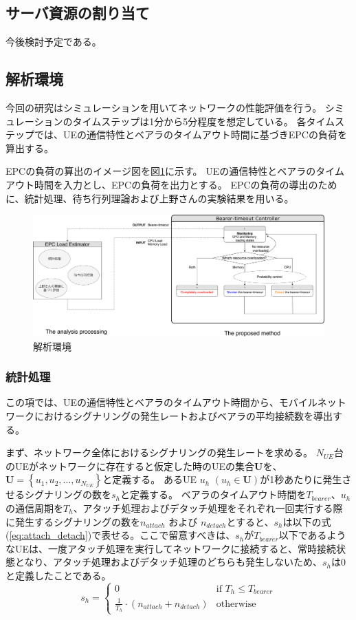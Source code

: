 \documentclass[a4j]{ujarticle}
\begin{document}
\subsection{サーバ資源の割り当て}
今後検討予定である。


\subsection{解析環境}
\label{sec:method}
今回の研究はシミュレーションを用いてネットワークの性能評価を行う。
シミュレーションのタイムステップは1分から5分程度を想定している。
各タイムステップでは、UEの通信特性とベアラのタイムアウト時間に基づきEPCの負荷を算出する。

EPCの負荷の算出のイメージ図を図\ref{analysis_environment}に示す。
UEの通信特性とベアラのタイムアウト時間を入力とし、EPCの負荷を出力とする。
EPCの負荷の導出のために、統計処理、待ち行列理論および上野さんの実験結果を用いる。
\begin{figure}[htbp]
	\centering
	\includegraphics[width=0.9\hsize]{analysis_environment.pdf}
  \caption{解析環境}
	\label{analysis_environment}
\end{figure}
\clearpage

\subsubsection{統計処理}
この項では、UEの通信特性とベアラのタイムアウト時間から、モバイルネットワークにおけるシグナリングの発生レートおよびベアラの平均接続数を導出する。


まず、ネットワーク全体におけるシグナリングの発生レートを求める。
$N_{UE}$台のUEがネットワークに存在すると仮定した時のUEの集合$\bm{U}$を、$\bm{U} = \left\{ u_1,u_2,\ldots,u_{N_{UE}} \right\}$と定義する。
あるUE $u_h$ $(u_h \in \bm{U})$が1秒あたりに発生させるシグナリングの数を$s_h$と定義する。
ベアラのタイムアウト時間を$T_{bearer}$、$u_h$の通信周期を$T_h$、アタッチ処理およびデタッチ処理をそれぞれ一回実行する際に発生するシグナリングの数を$n_{attach}$ および $n_{detach}$とすると、$s_h$は以下の式(\ref{eq:attach_detach})で表せる。ここで留意すべきは、$s_h$が$T_{bearer}$以下であるようなUEは、一度アタッチ処理を実行してネットワークに接続すると、常時接続状態となり、アタッチ処理およびデタッチ処理のどちらも発生しないため、$s_h$は0と定義したことである。
\begin{equation}
  s_h  =
  \begin{cases}
    0 & \text{if $T_h \le T_{bearer}$} \\
    \frac{1}{T_h} \cdot (n_{attach} + n_{detach}) & \text{otherwise}
  \end{cases}
  \label{eq:attach_detach}
\end{equation}
\end{document}
